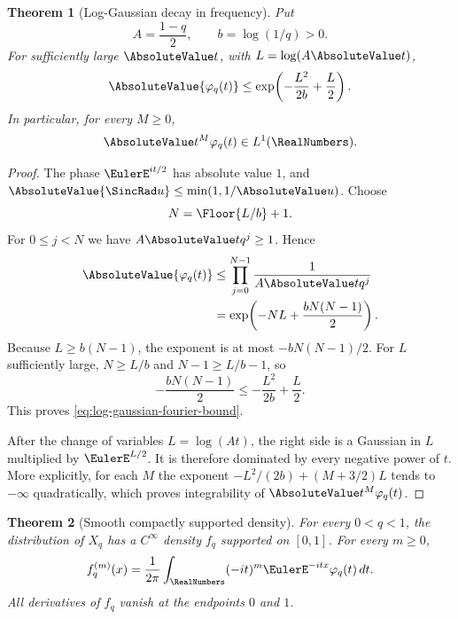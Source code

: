 \documentclass[11pt,a4paper,oneside,openany]{book}
\newtheorem{theorem}{Theorem}[chapter]
\theoremstyle{definition}
\theoremstyle{remark}
\begin{document}
\begin{theorem}[Log-Gaussian decay in frequency]\label{thm:geometric-uniform-fourier-decay}
Put
\[
 A=\frac{1-q}{2},
 \qquad
 b=\log(1/q)>0.
\]
For sufficiently large $\AbsoluteValue t$, with $L=\log(A\AbsoluteValue t)$,
\begin{equation}\label{eq:log-gaussian-fourier-bound}
 \AbsoluteValue{\varphi_q(t)}
 \le \exp\!\left(-\frac{L^2}{2b}+\frac L2\right).
\end{equation}
In particular, for every $M\ge0$,
\[
 \AbsoluteValue t^M\varphi_q(t)\in L^1(\RealNumbers).
\]
\end{theorem}

\begin{proof}
The phase $\EulerE^{it/2}$ has absolute value $1$, and
$\AbsoluteValue{\SincRad u}\le\min(1,1/\AbsoluteValue u)$.  Choose
\[
 N=\Floor{L/b}+1.
\]
For $0\le j<N$ we have $A\AbsoluteValue t q^j\ge1$.  Hence
\begin{align*}
 \AbsoluteValue{\varphi_q(t)}
 &\le\prod_{j=0}^{N-1}\frac1{A\AbsoluteValue t q^j}\\
 &=\exp\!\left(-NL+\frac{bN(N-1)}2\right).
\end{align*}
Because $L\ge b(N-1)$, the exponent is at most
$-bN(N-1)/2$.  For $L$ sufficiently large,
$N\ge L/b$ and $N-1\ge L/b-1$, so
\[
 -\frac{bN(N-1)}2
 \le-\frac{L^2}{2b}+\frac L2.
\]
This proves \eqref{eq:log-gaussian-fourier-bound}.

After the change of variables $L=\log(A t)$, the right side is a Gaussian in $L$ multiplied by $\EulerE^{L/2}$.  It is therefore dominated by every negative power of $t$.  More explicitly, for each $M$ the exponent
$-L^2/(2b)+(M+3/2)L$ tends to $-\infty$ quadratically, which proves integrability of $\AbsoluteValue t^M\varphi_q(t)$.
\end{proof}

\begin{theorem}[Smooth compactly supported density]\label{thm:geometric-uniform-smooth-density}
For every $0<q<1$, the distribution of $X_q$ has a $C^\infty$ density $f_q$ supported on $[0,1]$.  For every $m\ge0$,
\begin{equation}\label{eq:geometric-uniform-density-fourier}
 f_q^{(m)}(x)
 =\frac1{2\pi}\int_{\RealNumbers}(-it)^m \EulerE^{-itx}\varphi_q(t)\,dt.
\end{equation}
All derivatives of $f_q$ vanish at the endpoints $0$ and $1$.
\end{theorem}
\end{document}
